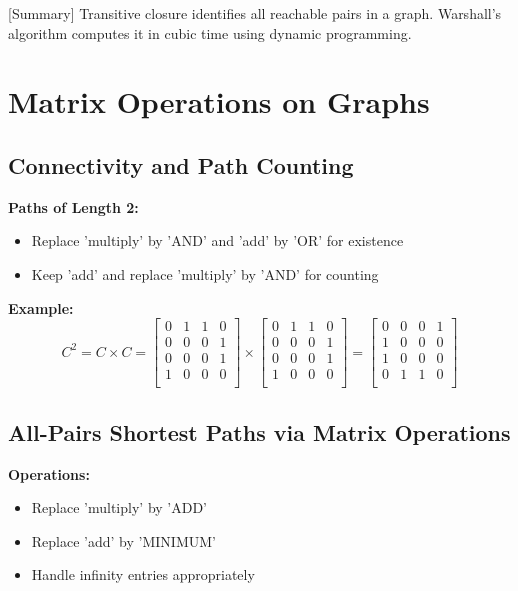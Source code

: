 \documentclass[12pt]{article}
\begin{document}
    [Summary] Transitive closure identifies all reachable pairs in a graph. Warshall's algorithm computes it in cubic time using dynamic programming.

\section{Matrix Operations on Graphs}

\subsection{Connectivity and Path Counting}

\textbf{Paths of Length 2:}
\begin{itemize}
    \item Replace 'multiply' by 'AND' and 'add' by 'OR' for existence
    \item Keep 'add' and replace 'multiply' by 'AND' for counting
\end{itemize}

\textbf{Example:}
\[
    C^2 = C \times C = \begin{bmatrix}
        0 & 1 & 1 & 0 \\
        0 & 0 & 0 & 1 \\
        0 & 0 & 0 & 1 \\
        1 & 0 & 0 & 0 \\
    \end{bmatrix} \times \begin{bmatrix}
        0 & 1 & 1 & 0 \\
        0 & 0 & 0 & 1 \\
        0 & 0 & 0 & 1 \\
        1 & 0 & 0 & 0 \\
    \end{bmatrix} = \begin{bmatrix}
        0 & 0 & 0 & 1 \\
        1 & 0 & 0 & 0 \\
        1 & 0 & 0 & 0 \\
        0 & 1 & 1 & 0 \\
    \end{bmatrix}
\]

\subsection{All-Pairs Shortest Paths via Matrix Operations}

\textbf{Operations:}
\begin{itemize}
    \item Replace 'multiply' by 'ADD'
    \item Replace 'add' by 'MINIMUM'
    \item Handle infinity entries appropriately
\end{itemize}
\end{document}
